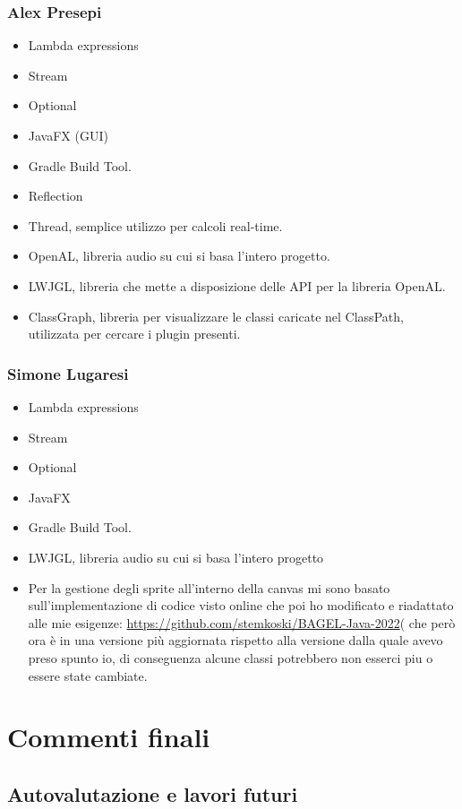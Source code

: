 \documentclass[a4paper,12pt]{report}
\begin{document}
\subsection*{Alex Presepi}
\begin{itemize}
	\item Lambda expressions
	\item Stream
	\item Optional
	\item JavaFX (GUI)
	\item Gradle Build Tool.
	\item Reflection
	\item Thread, semplice utilizzo per calcoli real-time.
	\item OpenAL,  libreria audio su cui si basa l’intero progetto.
	\item LWJGL, libreria che mette a disposizione delle API per la libreria OpenAL.
	\item ClassGraph, libreria per visualizzare le classi caricate nel ClassPath, utilizzata per cercare i plugin presenti.
\end{itemize}
\subsection*{Simone Lugaresi}
\begin{itemize}
	\item Lambda expressions
	\item Stream
	\item Optional
	\item JavaFX
	\item Gradle Build Tool.
	\item LWJGL, libreria audio su cui si basa l’intero progetto
	\item Per la gestione degli sprite all'interno della canvas mi sono basato sull'implementazione di codice visto online che poi ho modificato e riadattato alle mie esigenze: \url{https://github.com/stemkoski/BAGEL-Java-2022}( che però ora è in una versione più aggiornata rispetto alla versione dalla quale avevo preso spunto io, di conseguenza alcune classi potrebbero non esserci piu o essere state cambiate.
\end{itemize}

\chapter{Commenti finali}
\section{Autovalutazione e lavori futuri}
\end{document}
